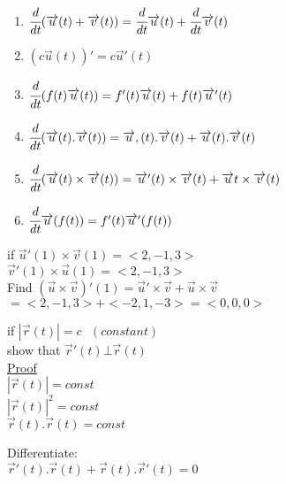 \begin{enumerate}
    \item $\cfrac{d}{dt}(\overrightarrow{u}(t)+\overrightarrow{v}(t))=\cfrac{d}{dt}\overrightarrow{u}(t)+\cfrac{d}{dt}\overrightarrow{v}(t)$
    \item $(c\overrightarrow{u}(t))'=c\overrightarrow{u}'(t)$
    \item $\cfrac{d}{dt}(f(t)\overrightarrow{u}(t))=f'(t)\overrightarrow{u}(t)+f(t)\overrightarrow{u}'(t)$
    \item $\cfrac{d}{dt}(\overrightarrow{u}(t).\overrightarrow{v}(t))=\overrightarrow{u},(t).\overrightarrow{v}(t)+\overrightarrow{u}(t).\overrightarrow{v}(t)$
    \item $\cfrac{d}{dt}(\overrightarrow{u}(t)\times\overrightarrow{v}(t))=\overrightarrow{u}'(t)\times\overrightarrow{v}(t)+\overrightarrow{u}t\times\overrightarrow{v}(t)$
    \item $\cfrac{d}{dt}\overrightarrow{u}(f(t))=f'(t)\overrightarrow{u}'(f(t))$
\end{enumerate}
\noindent{\color{smalt(darkpowderblue)}\rule{\linewidth}{.2mm}}
\begin{example}
if $\overrightarrow{u}'(1)\times\overrightarrow{v}(1)=<2,-1,3>$\\
$\overrightarrow{v}'(1)\times\overrightarrow{u}(1)=<2,-1,3>$\\
Find $(\overrightarrow{u}\times\overrightarrow{v})'(1)=\overrightarrow{u}'\times\overrightarrow{v}+\overrightarrow{u}\times\overrightarrow{v}$\\
$=<2,-1,3>+<-2,1,-3>=<0,0,0>$
\end{example}
\noindent{\color{smalt(darkpowderblue)}\rule{\linewidth}{.2mm}}
\begin{example}
if $|\overrightarrow{r}(t)|=c~~~(constant)$\\
show that $\overrightarrow{r}'(t)\bot\overrightarrow{r}(t)$\\
\underline{\textbf{\large}\color{smalt(darkpowderblue)}Proof}\\
$|\overrightarrow{r}(t)|=const$\\
$|\overrightarrow{r}(t)|^2=const$\\
$\overrightarrow{r}(t).\overrightarrow{r}(t)=const$
\end{example}
\noindent{\color{smalt(darkpowderblue)}\rule{\linewidth}{.2mm}}
Differentiate:\\
$\overrightarrow{r}'(t).\overrightarrow{r}(t)+\overrightarrow{r}(t).\overrightarrow{r}'(t)=0$\\

